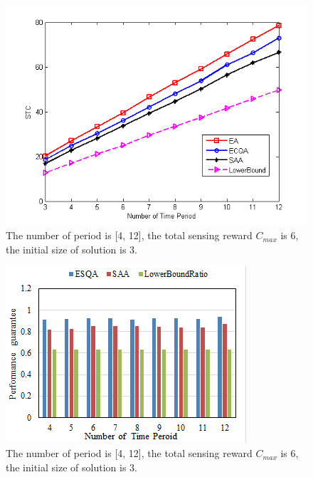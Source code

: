 \documentclass[journal]{IEEEtran}
\begin{document}
\begin{figure}
	\centering
	\includegraphics[width=1\linewidth]{Fig4(c).png}
	\caption{ The number of period is [4, 12], the total sensing reward $C_{max}$ is 6, the initial size of solution is 3.}
	\label{fig:figure5}
\end{figure}

\begin{figure}
	\centering
	\includegraphics[width=1\linewidth]{Fig4(d).png}
	\caption{The number of period is [4, 12], the total sensing reward $C_{max}$ is 6, the initial size of solution is 3.}
	\label{fig:figure5}
\end{figure}
\end{document}
